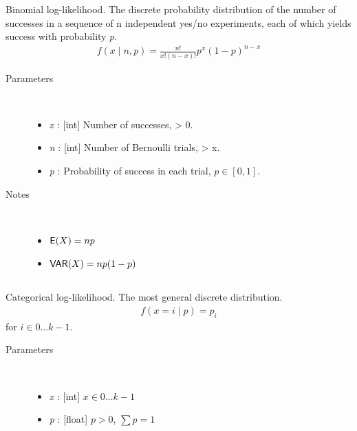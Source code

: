 \documentclass[]{jss}
\begin{document}
Binomial log-likelihood.  The discrete probability distribution of the
number of successes in a sequence of n independent yes/no experiments,
each of which yields success with probability $p$.
\begin{eqnarray*}
f(x \mid n, p) = \frac{n!}{x!(n-x)!} p^x (1-p)^{n-x}    
\end{eqnarray*}
\begin{description}
\item[Parameters] \ 

\begin{itemize}
\item {} 
\emph{x} : {[}int{]} Number of successes, \textgreater{} 0.

\item {} 
\emph{n} : {[}int{]} Number of Bernoulli trials, \textgreater{} x.

\item {} 
\emph{p} : Probability of success in each trial, $p \in [0,1]$.

\end{itemize}

\item[Notes] \ 

\begin{itemize}
\item {} 
$\mathsf{E}(X)=np$

\item {} 
$\mathsf{VAR}(X)=np(1-p)$

\end{itemize}


\end{description}




\subsection[categorical]{ }

Categorical log-likelihood. The most general discrete distribution.
\begin{eqnarray*}
f(x=i \mid p) = p_i    
\end{eqnarray*}
for $i \in 0 \ldots k-1$.
\begin{description}
\item[Parameters] \ 

\begin{itemize}
\item {} 
\emph{x} : {[}int{]} $x \in 0\ldots k-1$

\item {} 
\emph{p} : {[}float{]} $p > 0$, $\sum p = 1$

\end{itemize}

\end{description}
\end{document}
